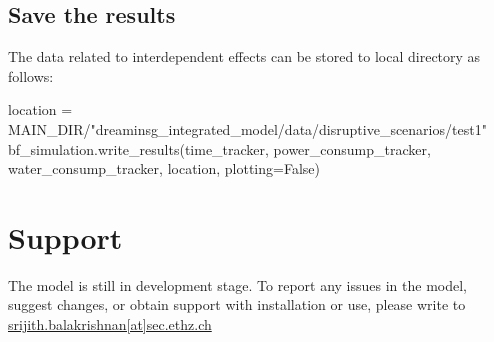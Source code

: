 \documentclass[letterpaper,12pt,english]{sphinxmanual}
\begin{document}
\section{Save the results}
The data related to interdependent effects can be stored to local directory as follows:

\begin{sphinxVerbatim}[commandchars=\\\{\}]
location = MAIN_DIR/"dreaminsg_integrated_model/data/disruptive_scenarios/test1"
bf_simulation.write_results(time_tracker, power_consump_tracker, water_consump_tracker, location, plotting=False)
\end{sphinxVerbatim}

\chapter{Support}
The model is still in development stage. To report any issues in the model, suggest changes, or obtain support with installation or use, please write to {\href{mailto:srijith.balakrishnan@ethz.ch}{srijith.balakrishnan[at]sec.ethz.ch}}





\end{document}

